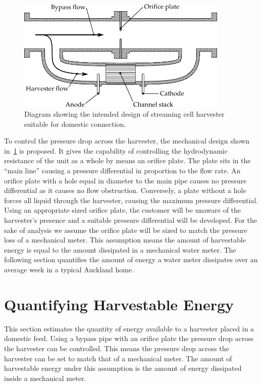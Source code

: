     \begin{figure}
      \centering
      \includegraphics[width=0.9\textwidth]{content/pt1/02-WirelessWaterMeter/graphics/harvester}
      \caption{\label{fig:Diagram_harvester}Diagram showing the intended design of streaming cell harvester suitable for domestic connection.}
    \end{figure}
    To control the pressure drop across the harvester, the mechanical design shown in~\cref{fig:Diagram_harvester} is proposed.
    It gives the capability of controlling the hydrodynamic resistance of the unit as a whole by means an orifice plate.
    The plate sits in the ``main line'' causing a pressure differential in proportion to the flow rate.
    An orifice plate with a hole equal in diameter to the main pipe causes no pressure differential as it causes no flow obstruction.
    Conversely, a plate without a hole forces all liquid through the harvester, causing the maximum pressure differential.
    Using an appropriate sized orifice plate, the customer will be unaware of the harvester's presence and a suitable pressure differential will be developed.
    For the sake of analysis we assume the orifice plate will be sized to match the pressure loss of a mechanical meter.
    This assumption means the amount of harvestable energy is equal to the amount dissipated in a mechanical water meter.
    The following section quantifies the amount of energy a water meter dissipates over an average week in a typical Auckland home.


  \section{Quantifying Harvestable Energy}
  \label{sect:part1-WirelessWaterMeter-QuantifyingHarvestableEnergy}

    This section estimates the quantity of energy available to a harvester placed in a domestic feed.
    Using a bypass pipe with an orifice plate the pressure drop across the harvester can be controlled.
    This means the pressure drop across the harvester can be set to match that of a mechanical meter.
    The amount of harvestable energy under this assumption is the amount of energy dissipated inside a mechanical meter.

